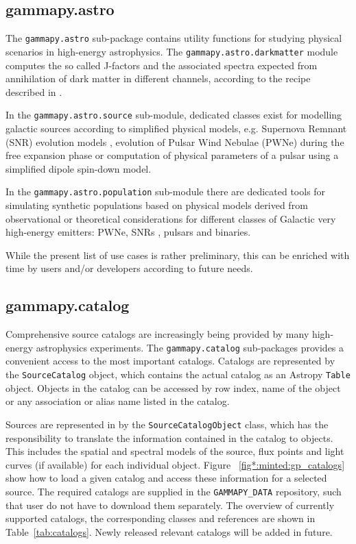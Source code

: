 \documentclass[longauth]{aa}
\newcommand{\code}[1]{\texttt{#1}}
\begin{document}
\subsection{gammapy.astro}
\label{ssec:gammapy-astro}
The \code{gammapy.astro} sub-package contains utility functions for studying physical
scenarios in high-energy astrophysics. The \code{gammapy.astro.darkmatter} module
computes the so called J-factors and the associated \gammaray spectra expected
from annihilation of dark matter in different channels, according to the recipe
described in \cite{2011JCAP...03..051C}.

In the \code{gammapy.astro.source} sub-module, dedicated classes exist for modelling
galactic \gammaray sources according to simplified physical models, e.g. Supernova Remnant (SNR) evolution
models \citep{1950RSPSA.201..159T, 1999ApJS..120..299T}, evolution of Pulsar Wind Nebulae (PWNe) during the
free expansion phase \citep{2006ARA&A..44...17G} or computation
of physical parameters of a pulsar using a simplified dipole spin-down model.

In the \code{gammapy.astro.population} sub-module there are dedicated tools
for simulating synthetic populations based on physical models derived from
observational or theoretical considerations for different classes of Galactic
very high-energy \gammaray emitters: PWNe, SNRs \cite{1998ApJ...504..761C},
pulsars \cite{2006ApJ...643..332F, 2006MNRAS.372..777L, 2004A&A...422..545Y}
and \gammaray binaries.

While the present list of use cases is rather preliminary, this can be enriched
with time by users and/or developers according to future needs.

\subsection{gammapy.catalog}
\label{ssec:gammapy-catalog}
Comprehensive source catalogs are increasingly being provided by many high-energy
astrophysics experiments. The \code{gammapy.catalog} sub-packages
provides a convenient access to the most important \gammaray catalogs.
Catalogs are represented by the \code{SourceCatalog} object, which
contains the actual catalog as an Astropy \code{Table} object.
Objects in the catalog can be accessed by row index, name of the
object or any association or alias name listed in the catalog.

Sources are represented in \gammapy by the \code{SourceCatalogObject}
class, which has the responsibility to translate the information
contained in the catalog to \gammapy objects. This includes
the spatial and spectral models of the source, flux points and
light curves (if available) for each individual object. 
Figure ~\ref{fig*:minted:gp_catalogs}
show how to load a given catalog and access these information for a selected source.
The required catalogs are supplied in the \code{GAMMAPY\_DATA} repository, such that 
user do not have to download them separately.
The overview of currently supported catalogs, the corresponding
\gammapy classes and references are shown in Table~\ref{tab:catalogs}.
Newly released relevant catalogs will be added in future.
\end{document}
